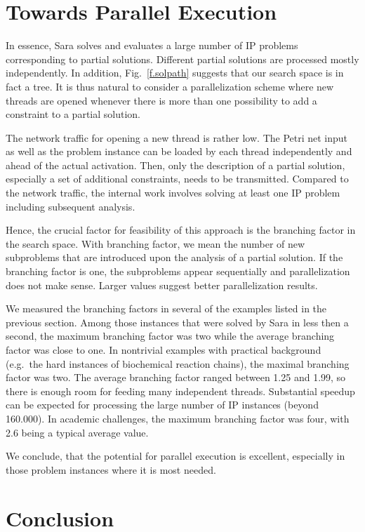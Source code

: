 \documentclass{LMCS}
\begin{document}
\section{Towards Parallel Execution}

In essence, Sara solves and evaluates a large number of IP problems corresponding to partial solutions.
Different partial solutions are processed mostly independently. In addition, Fig.~\ref{f.solpath} suggests that
our search space is in fact a tree. It is thus natural to consider a parallelization scheme where new threads are
opened whenever there is more than one possibility to add a constraint to a partial solution. 

The network traffic for opening a new thread is rather low. The Petri net input as well as the problem instance can be 
loaded by each thread independently and ahead of the actual activation. Then, only the description of a partial
solution, especially a set of additional constraints, needs to be transmitted. Compared to the network traffic,
the internal work involves solving at least one IP problem including subsequent analysis. 

Hence, the crucial factor for feasibility of
this approach is the branching factor in the search space. With branching factor, we mean the number of new subproblems
that are introduced upon the analysis of a partial solution. If the branching factor is one, the subproblems appear sequentially
and parallelization does not make sense. Larger values suggest better parallelization results.

We measured the branching factors in several of the examples listed in the previous section. Among those instances that were
solved by Sara in less then a second, the maximum branching factor was two while the average branching factor was close to one.
In nontrivial examples with practical background (e.g.~the hard instances of biochemical reaction chains), the maximal branching factor was
two. The average branching factor ranged between 1.25 and 1.99, so there is enough room for feeding many independent threads.
Substantial speedup can be expected for processing the large number of IP instances (beyond 160.000).
In academic challenges, the maximum branching factor was four, with 2.6 being a typical average value.

We conclude, that the potential for parallel execution is excellent, especially in those problem instances where it is
most needed. 

\section{Conclusion}
\end{document}
